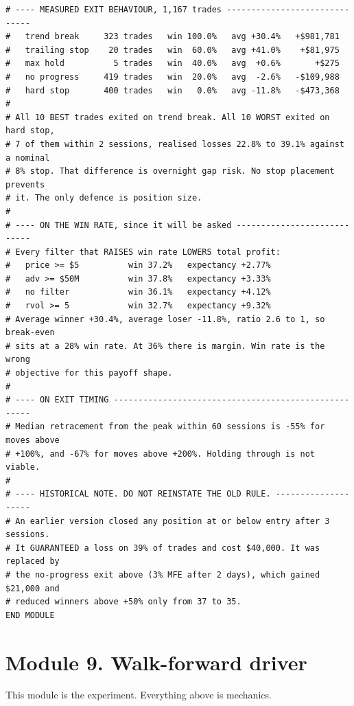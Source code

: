\documentclass[10pt]{article}
\begin{document}
\begin{lstlisting}
# ---- MEASURED EXIT BEHAVIOUR, 1,167 trades ------------------------------
#   trend break     323 trades   win 100.0%   avg +30.4%   +$981,781
#   trailing stop    20 trades   win  60.0%   avg +41.0%    +$81,975
#   max hold          5 trades   win  40.0%   avg  +0.6%       +$275
#   no progress     419 trades   win  20.0%   avg  -2.6%   -$109,988
#   hard stop       400 trades   win   0.0%   avg -11.8%   -$473,368
#
# All 10 BEST trades exited on trend break. All 10 WORST exited on hard stop,
# 7 of them within 2 sessions, realised losses 22.8% to 39.1% against a nominal
# 8% stop. That difference is overnight gap risk. No stop placement prevents
# it. The only defence is position size.
#
# ---- ON THE WIN RATE, since it will be asked ----------------------------
# Every filter that RAISES win rate LOWERS total profit:
#   price >= $5          win 37.2%   expectancy +2.77%
#   adv >= $50M          win 37.8%   expectancy +3.33%
#   no filter            win 36.1%   expectancy +4.12%
#   rvol >= 5            win 32.7%   expectancy +9.32%
# Average winner +30.4%, average loser -11.8%, ratio 2.6 to 1, so break-even
# sits at a 28% win rate. At 36% there is margin. Win rate is the wrong
# objective for this payoff shape.
#
# ---- ON EXIT TIMING -----------------------------------------------------
# Median retracement from the peak within 60 sessions is -55% for moves above
# +100%, and -67% for moves above +200%. Holding through is not viable.
#
# ---- HISTORICAL NOTE. DO NOT REINSTATE THE OLD RULE. --------------------
# An earlier version closed any position at or below entry after 3 sessions.
# It GUARANTEED a loss on 39% of trades and cost $40,000. It was replaced by
# the no-progress exit above (3% MFE after 2 days), which gained $21,000 and
# reduced winners above +50% only from 37 to 35.
END MODULE
\end{lstlisting}

\section{Module 9. Walk-forward driver}

This module is the experiment. Everything above is mechanics.
\end{document}
